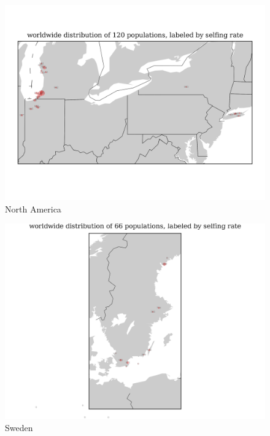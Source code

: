 \documentclass[a4paper,10pt]{article}
\begin{document}
\begin{figure}
\includegraphics[width=1\textwidth]{figures/s0829popid2ecotypeid_5_NorAm__88_38__72_45_l3y1_pop_map.png}
\caption{North America}\label{f16}
\end{figure}


\begin{figure}
\includegraphics[width=1\textwidth]{figures/s0829popid2ecotypeid_25_Swe_10_52_20_65_l3y1_pop_map.png}
\caption{Sweden}\label{f21}
\end{figure}
\end{document}

